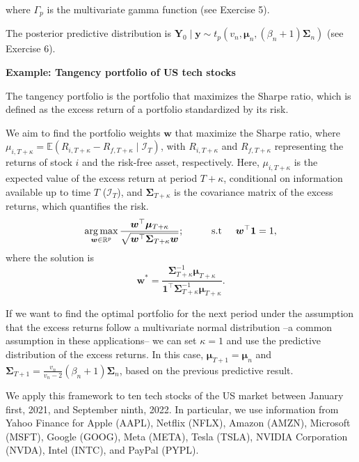 \begin{enumerate}
where $\Gamma_p$ is the multivariate gamma function (see Exercise 5).

The posterior predictive distribution is $\bm{Y}_0\mid \bm{y}\sim t_p(v_n,\bm{\mu}_n,(\beta_n+1)\bm{\Sigma}_n)$ (see Exercise 6).

\textbf{Example: Tangency portfolio of US tech stocks}

The tangency portfolio is the portfolio that maximizes the Sharpe ratio, which is defined as the excess return of a portfolio standardized by its risk.

We aim to find the portfolio weights \( \bm{w} \) that maximize the Sharpe ratio, where \( \mu_{i,T+\kappa} = \mathbb{E}\left( R_{i,T+\kappa} - R_{f,T+\kappa} \mid \mathcal{I}_T \right) \), with \( R_{i,T+\kappa} \) and \( R_{f,T+\kappa} \) representing the returns of stock \( i \) and the risk-free asset, respectively. Here, \( \mu_{i,T+\kappa} \) is the expected value of the excess return at period \( T+\kappa \), conditional on information available up to time \( T \) (\( \mathcal{I}_T \)), and \( \bm{\Sigma}_{T+\kappa} \) is the covariance matrix of the excess returns, which quantifies the risk.
\begin{equation*}
	\operatorname*{arg\,max}_{{\bm w}\in \mathbb{R}^{p}} \frac{{\bm w}^{\top}\bm{\mu}_{T+\kappa}}{\sqrt{{\bm w}^{\top}{\bm{\Sigma}}_{T+\kappa} {\bm w}}}; \hspace{1cm} \text{s.t}\hspace{.5cm} {\bm w}^{\top}{\bm{1}}=1,
\end{equation*}
where the solution is
\begin{equation*}
	{\bm w}^*=\frac{{\bm{\Sigma}}^{-1}_{T+\kappa}\bm{\mu}_{T+\kappa}}{{\bm{1}}^{\top}{\bm \Sigma}^{-1}_{T+\kappa}\bm{\mu}_{T+\kappa}}.
\end{equation*}

If we want to find the optimal portfolio for the next period under the assumption that the excess returns follow a multivariate normal distribution --a common assumption in these applications-- we can set \( \kappa = 1 \) and use the predictive distribution of the excess returns. In this case, \( \bm{\mu}_{T+1} = \bm{\mu}_n \) and \( \bm{\Sigma}_{T+1} = \frac{v_n}{v_n - 2} (\beta_n + 1) \bm{\Sigma}_n \), based on the previous predictive result.

We apply this framework to ten tech stocks of the US market between January first, 2021, and September ninth, 2022. In particular, we use information from Yahoo Finance for Apple (AAPL), Netflix (NFLX), Amazon (AMZN), Microsoft (MSFT), Google (GOOG), Meta (META), Tesla (TSLA), NVIDIA Corporation (NVDA), Intel (INTC), and PayPal (PYPL).


\end{enumerate}
